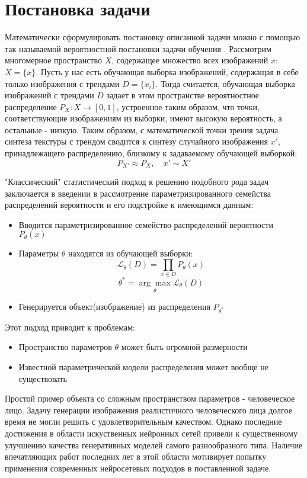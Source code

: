 \section{Постановка задачи}
	Математически сформулировать постановку описанной задачи можно с помощью так называемой вероятностной постановки задачи обучения \cite{Voron-ML, GAN}.
	Рассмотрим многомерное пространство $X$, содержащее множество всех изображений $x$: $X = \{x\}$. Пусть у нас есть обучающая выборка изображений, содержащая в себе только изображения с трендами $D = \{x_i\}$. Тогда считается, обучающая выборка изображений с трендами $D$ задает в этом пространстве вероятностное распределение $P_X : X \longrightarrow [0,1]$, устроенное таким образом, что точки, соответствующие изображениям из выборки, имеют высокую вероятность, а остальные - низкую. Таким образом, с математической точки зрения задача синтеза текстуры с трендом сводится к синтезу случайного изображения $x'$, принадлежащего распределению, близкому к задаваемому обучающей выборкой:
	$$ P_{X'} \approx P_X, \quad x' \sim X'$$
	
	"Классический" статистический подход к решению подобного рода задач заключается в введении в рассмотрение параметризированного семейства распределений вероятности и его подстройке к имеющимся данным:
	\begin{itemize}
		\item Вводится параметризированное семейство распределений вероятности $P_{\theta}(x)$
		\item Параметры $\theta$ находятся из обучающей выборки:
		$$ \mathcal{L}_{\theta}(D) = \prod_{x \in D} P_{\theta}(x) $$
		$$ \theta^{*} = \underset{\theta}{\arg\max} \mathcal{L}_{\theta}(D)$$
		\item Генерируется объект(изображение) из распределения $ P_{\theta^{*}}$
	\end{itemize}
	Этот подход приводит к проблемам:
	\begin{itemize}
		\item Пространство параметров $\theta$ может быть огромной размерности
		\item Известной параметрической модели распределения может вообще не существовать
	\end{itemize}
	Простой пример объекта со сложным пространством параметров - человеческое лицо. Задачу генерации изображения реалистичного человеческого лица долгое время не могли решить с удовлетворительным качеством. Однако последние достижения в области искуственных нейронных сетей привели к существенному улучшению качества генеративных моделей самого разнообразного типа. Наличие впечатляющих работ последних лет в этой области \cite{cGAN, cGAN-face, BEGAN, EBGAN, texture-networks} мотивирует попытку применения современных нейросетевых подходов в поставленной задаче.